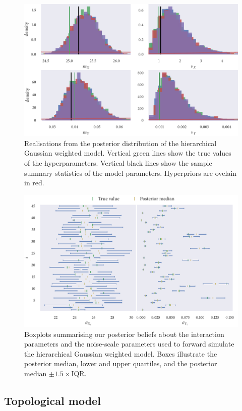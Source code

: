 \begin{figure}[tbp]
  \includegraphics{gauss_hier_hist_hypers.pdf}
  \caption{Realisations from the posterior distribution of the hierarchical Gaussian
  weighted model. Vertical green lines show the true values of the hyperparameters.
  Vertical black lines show the sample summary statistics of the model parameters.
  Hyperpriors are ovelain in red.}
  \label{fig:gauss_hier_hist}
\end{figure}
\begin{figure}[tbp]
  \includegraphics{gauss_hier_summary.pdf}
  \caption{Boxplots summarising our posterior beliefs about the interaction parameters
    and the noise-scale parameters used to forward simulate the hierarchical Gaussian
    weighted model. Boxes illustrate the posterior median, lower and upper quartiles, and
    the posterior median $\pm1.5\times\text{IQR}$.}
\end{figure}

\subsection{Topological model}

